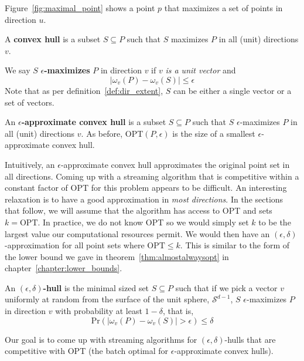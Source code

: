 Figure~\ref{fig:maximal_point} shows a point $p$ that maximizes a set of points in direction $u$.

\begin{definition}
A \textbf{convex hull} is a subset $S \subseteq P$ such that $S$ maximizes $P$ in all (unit) directions $v$. 
\end{definition}

\begin{definition}
We say $S$ \textbf{$\epsilon$-maximizes} $P$ in direction $v$ if $v$ \emph{is a unit vector} and
\[ |\omega_v(P) - \omega_v(S)| \leq \epsilon \]
Note that as per definition~\ref{def:dir_extent}, $S$ can be either a single vector or a set of vectors.
\end{definition}

\begin{definition}
An \textbf{$\epsilon$-approximate convex hull} is a subset $S \subseteq P$ such that $S$ $\epsilon$-maximizes $P$ in all (unit) directions $v$. As before, OPT$(P, \epsilon)$ is the size of a smallest $\epsilon$-approximate convex hull.
\end{definition}

Intuitively, an $\epsilon$-approximate convex hull approximates the original point set in all directions. Coming up with a streaming algorithm that is competitive within a constant factor of OPT for this problem appears to be difficult. An interesting relaxation is to have a good approximation in \emph{most directions}. In the sections that follow, we will assume that the algorithm has access to OPT and sets $k = \mbox{OPT}$. In practice, we do not know OPT so we would simply set $k$ to be the largest value our computational resources permit. We would then have an $(\epsilon, \delta)$-approximation for all point sets where $\mbox{OPT} \leq k$. This is similar to the form of the lower bound we gave in theorem~\ref{thm:almostalwaysopt} in chapter~\ref{chapter:lower_bounds}.

\begin{definition}
An \textbf{$(\epsilon, \delta)$-hull} is the minimal sized set $S \subseteq P$ such that if we pick a vector $v$ uniformly at random from the surface of the unit sphere, $\mathcal{S}^{d-1}$, $S$ $\epsilon$-maximizes $P$ in direction $v$ with probability at least $1-\delta$, that is,
\[ \mbox{Pr}(|\omega_v(P) - \omega_v(S)| > \epsilon) \leq \delta \]
\end{definition}

Our goal is to come up with streaming algorithms for $(\epsilon, \delta)$-hulls that are competitive with OPT (the batch optimal for $\epsilon$-approximate convex hulls).

